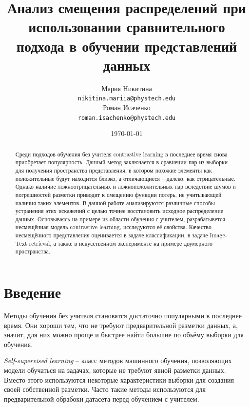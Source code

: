 \documentclass[a4paper, 14pt]{article}
\title{Анализ смещения распределений при использовании сравнительного подхода в обучении представлений данных}
\author{
    Мария Никитина \\
	\texttt{nikitina.mariia@phystech.edu} \\
	\And
 	Роман Исаченко \\
	\texttt{roman.isachenko@phystech.edu}
}
\date{\today}
\begin{document}

\setcounter{page}{2}

\begin{abstract}
Среди подходов обучения без учителя contrastive learning в последнее время снова приобретает популярность. Данный метод заключается в сравнении пар из выборки для получения пространства представления, в котором похожие элементы как положительные будут находится близко, а отличающиеся -- далеко, как отрицательные. Однако наличие ложноотрицательных и ложноположительных пар вследствие шумов и погрешностей разметки приводит к смещению функции потерь, не учитывающей наличия таких элементов. В данной работе анализируются различные способы устранения этих искажений с целью точнее восстановить исходное распределение данных. Основываясь на примере из области обучения с учителем, разрабатывется несмещённая модель contrastive learning, исследуются её свойства. Качество несмещённого представления оценивается в задаче классификации, в задаче Image-Text retrieval, а также в искусственном эксперименте на примере двумерного пространства.
\end{abstract}


\newpage

\tableofcontents
\clearpage %


\section{Введение}

Методы обучения без учителя становятся достаточно популярными в последнее время. Они хороши тем, что не требуют предварительной разметки данных, а, значит, для них можно проще и быстрее найти большие по объёму выборки для обучения.

\textit{Self-supervised learning} -- класс методов машинного обучения, позволяющих модели обучаться на задачах, которые не требуют явной разметки данных. Вместо этого используются некоторые характеристики выборки для создания своей собственной разметки. Часто такие методы используются для предварительной обрабоки датасета перед обучением с учителем.
\end{document}
